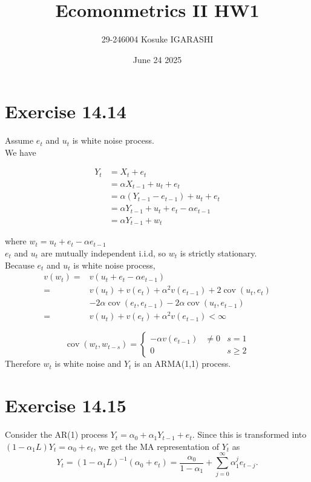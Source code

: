 \documentclass{article}
\title{Ecomonmetrics II HW1}
\author{29-246004 Kosuke IGARASHI}
\date{June 24 2025}
\begin{document}
\maketitle

\section{Exercise 14.14}
Assume $e_t$ and $u_t$ is white noise process.\\ 
We have
\begin{center}
           \begin{align*}
             Y_t&=X_t+e_t\\
             &=\alpha X_{t-1}+u_t+e_t\\
             &=\alpha (Y_{t-1}-e_{t-1})+u_t+e_t\\
             &=\alpha Y_{t-1}+u_t+e_t-\alpha e_{t-1}\\
             &=\alpha Y_{t-1}+w_t
            \end{align*}
           \end{center}

where $w_t=u_t+e_t-\alpha e_{t-1}$\\
$e_t$ and $u_t$ are mutually independent i.i.d, so {$w_t$} is strictly stationary.\\
Because $e_t$ and $u_t$ is white noise process,\\ 
$$
\begin{aligned}
v\left(w_t\right)= & v\left(u_t+e_t-\alpha e_{t-1}\right) \\
= & v\left(u_t\right)+v\left(e_t\right)+\alpha^2 v\left(e_{t-1}\right)+2 \operatorname{cov}\left(u_t, e_t\right) \\
& -2 \alpha \operatorname{cov}\left(e_t, e_{t-1}\right)-2 \alpha \operatorname{cov}\left(u_t, e_{t-1}\right) \\
= & v\left(u_t\right)+v\left(e_t\right)+\alpha^2 v\left(e_{t-1}\right)<\infty
\end{aligned}
$$

$$
\operatorname{cov}\left(w_t, w_{t-s}\right)
=\left\{\begin{array}{ccc}
-\alpha v\left(e_{t-1}\right) & \neq 0 & s=1 \\
0 & & s \geq 2
\end{array}\right.
$$
Therefore  ${w_t}$  is white noise and $Y_t$ is an ARMA(1,1) process.

\section{Exercise 14.15}
    Consider the AR(1) process \(Y_t =\alpha_0 + \alpha_1 Y_{t-1} + e_t\).
    Since this is transformed into \((1-\alpha_1 L)Y_t=\alpha_0 + e_t\), we get the MA representation of \(Y_t\) as
    \[
    Y_t = (1-\alpha_1 L)^{-1}(\alpha_0+e_t)
         =\frac{\alpha_0}{1-\alpha_1} + \sum_{j=0}^\infty \alpha_1^j e_{t-j}.
    \]
    
\end{document}
